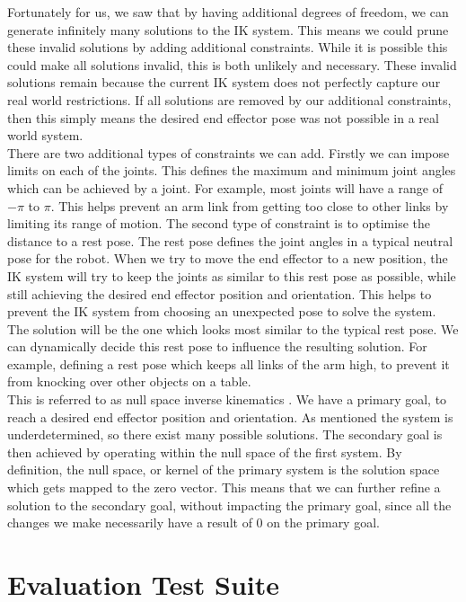 Fortunately for us, we saw that by having additional degrees of freedom, we can generate infinitely many solutions to the IK system. This means we could prune these invalid solutions by adding additional constraints. While it is possible this could make all solutions invalid, this is both unlikely and necessary. These invalid solutions remain because the current IK system does not perfectly capture our real world restrictions. If all solutions are removed by our additional constraints, then this simply means the desired end effector pose was not possible in a real world system.\\

There are two additional types of constraints we can add. Firstly we can impose limits on each of the joints. This defines the maximum and minimum joint angles which can be achieved by a joint. For example, most joints will have a range of $-\pi$ to $\pi$. This helps prevent an arm link from getting too close to other links by limiting its range of motion. The second type of constraint is to optimise the distance to a rest pose. The rest pose defines the joint angles in a typical neutral pose for the robot. When we try to move the end effector to a new position, the IK system will try to keep the joints as similar to this rest pose as possible, while still achieving the desired end effector position and orientation. This helps to prevent the IK system from choosing an unexpected pose to solve the system. The solution will be the one which looks most similar to the typical rest pose. We can dynamically decide this rest pose to influence the resulting solution. For example, defining a rest pose which keeps all links of the arm high, to prevent it from knocking over other objects on a table.\\

This is referred to as null space inverse kinematics \cite{null-space}. We have a primary goal, to reach a desired end effector position and orientation. As mentioned the system is underdetermined, so there exist many possible solutions. The secondary goal is then achieved by operating within the null space of the first system. By definition, the null space, or kernel of the primary system is the solution space which gets mapped to the zero vector. This means that we can further refine a solution to the secondary goal, without impacting the primary goal, since all the changes we make necessarily have a result of 0 on the primary goal.


\chapter{Evaluation Test Suite}
\label{apx:test-suite}

